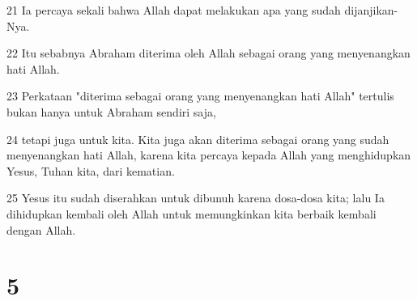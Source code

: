 \par 21 Ia percaya sekali bahwa Allah dapat melakukan apa yang sudah dijanjikan-Nya.
\par 22 Itu sebabnya Abraham diterima oleh Allah sebagai orang yang menyenangkan hati Allah.
\par 23 Perkataan "diterima sebagai orang yang menyenangkan hati Allah" tertulis bukan hanya untuk Abraham sendiri saja,
\par 24 tetapi juga untuk kita. Kita juga akan diterima sebagai orang yang sudah menyenangkan hati Allah, karena kita percaya kepada Allah yang menghidupkan Yesus, Tuhan kita, dari kematian.
\par 25 Yesus itu sudah diserahkan untuk dibunuh karena dosa-dosa kita; lalu Ia dihidupkan kembali oleh Allah untuk memungkinkan kita berbaik kembali dengan Allah.

\chapter{5}

